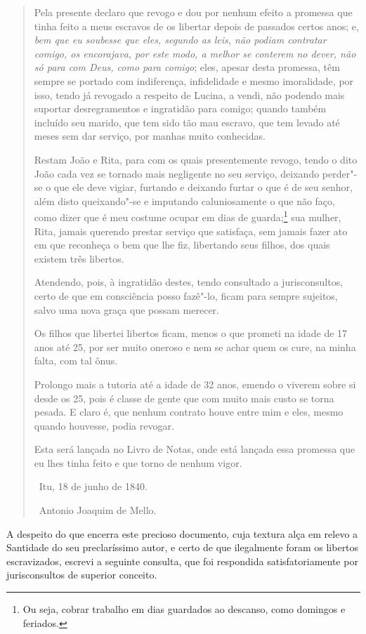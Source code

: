 \begin{quote}
Pela presente declaro que revogo e dou por nenhum efeito a promessa que
tinha feito a meus escravos de os libertar depois de passados certos
anos; e, \emph{bem que eu soubesse que eles, segundo as leis, não podiam
contratar comigo, os encorajava, por este modo, a melhor se conterem no
dever, não só para com Deus, como para comigo}; eles, apesar desta
promessa, têm sempre se portado com indiferença, infidelidade e mesmo
imoralidade, por isso, tendo já revogado a respeito de Lucina, a vendi,
não podendo mais suportar desregramentos e ingratidão para comigo;
quando também incluído seu marido, que tem sido tão mau escravo, que tem
levado até meses sem dar serviço, por manhas muito conhecidas.

Restam João e Rita, para com os quais presentemente revogo, tendo o dito
João cada vez se tornado mais negligente no seu serviço, deixando
perder"-se o que ele deve vigiar, furtando e deixando furtar o que é de
seu senhor, além disto queixando"-se e imputando caluniosamente o que não
faço, como dizer que é meu costume ocupar em dias de guarda;\footnote{
  Ou seja, cobrar trabalho em dias guardados ao descanso, como domingos
  e feriados.} sua mulher, Rita, jamais querendo prestar serviço que
satisfaça, sem jamais fazer ato em que reconheça o bem que lhe fiz,
libertando seus filhos, dos quais existem três libertos.

Atendendo, pois, à ingratidão destes, tendo consultado a jurisconsultos,
certo de que em consciência posso fazê"-lo, ficam para sempre sujeitos,
salvo uma nova graça que possam merecer.

Os filhos que libertei libertos ficam, menos o que prometi na idade de
17 anos até 25, por ser muito oneroso e nem se achar quem os cure, na
minha falta, com tal ônus.

Prolongo mais a tutoria até a idade de 32 anos, emendo o viverem sobre
si desde os 25, pois é classe de gente que com muito mais custo se torna
pesada. E claro é, que nenhum contrato houve entre mim e eles, mesmo
quando houvesse, podia revogar.

Esta será lançada no Livro de Notas, onde está lançada essa promessa que
eu lhes tinha feito e que torno de nenhum vigor.

\hfill\ Itu, 18 de junho de 1840.\smallskip

\hfill\ Antonio Joaquim de Mello.
\end{quote}

A despeito do que encerra este precioso documento, cuja textura alça em
relevo a Santidade do seu preclaríssimo autor, e certo de que
ilegalmente foram os libertos escravizados, escrevi a seguinte consulta,
que foi respondida satisfatoriamente por jurisconsultos de superior
conceito.

